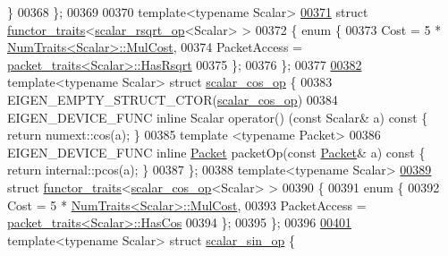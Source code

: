 \begin{DoxyCode}
       \}
00368 \};
00369 
00370 \textcolor{keyword}{template}<\textcolor{keyword}{typename} Scalar>
\hyperlink{struct_eigen_1_1internal_1_1functor__traits_3_01scalar__rsqrt__op_3_01_scalar_01_4_01_4}{00371} \textcolor{keyword}{struct }\hyperlink{struct_eigen_1_1internal_1_1functor__traits}{functor\_traits}<\hyperlink{struct_eigen_1_1internal_1_1scalar__rsqrt__op}{scalar\_rsqrt\_op}<Scalar> >
00372 \{ \textcolor{keyword}{enum} \{
00373     Cost = 5 * \hyperlink{group___core___module_struct_eigen_1_1_num_traits}{NumTraits<Scalar>::MulCost},
00374     PacketAccess = \hyperlink{struct_eigen_1_1internal_1_1packet__traits}{packet\_traits<Scalar>::HasRsqrt}
00375   \};
00376 \};
00377 
\hyperlink{struct_eigen_1_1internal_1_1scalar__cos__op}{00382} \textcolor{keyword}{template}<\textcolor{keyword}{typename} Scalar> \textcolor{keyword}{struct }\hyperlink{struct_eigen_1_1internal_1_1scalar__cos__op}{scalar\_cos\_op} \{
00383   EIGEN\_EMPTY\_STRUCT\_CTOR(\hyperlink{struct_eigen_1_1internal_1_1scalar__cos__op}{scalar\_cos\_op})
00384   EIGEN\_DEVICE\_FUNC \textcolor{keyword}{inline} Scalar operator() (\textcolor{keyword}{const} Scalar& a)\textcolor{keyword}{ const }\{ \textcolor{keywordflow}{return} numext::cos(a); \}
00385   \textcolor{keyword}{template} <\textcolor{keyword}{typename} Packet>
00386   EIGEN\_DEVICE\_FUNC \textcolor{keyword}{inline} \hyperlink{union_eigen_1_1internal_1_1_packet}{Packet} packetOp(\textcolor{keyword}{const} \hyperlink{union_eigen_1_1internal_1_1_packet}{Packet}& a)\textcolor{keyword}{ const }\{ \textcolor{keywordflow}{return} internal::pcos(a); \}
00387 \};
00388 \textcolor{keyword}{template}<\textcolor{keyword}{typename} Scalar>
\hyperlink{struct_eigen_1_1internal_1_1functor__traits_3_01scalar__cos__op_3_01_scalar_01_4_01_4}{00389} \textcolor{keyword}{struct }\hyperlink{struct_eigen_1_1internal_1_1functor__traits}{functor\_traits}<\hyperlink{struct_eigen_1_1internal_1_1scalar__cos__op}{scalar\_cos\_op}<Scalar> >
00390 \{
00391   \textcolor{keyword}{enum} \{
00392     Cost = 5 * \hyperlink{group___core___module_struct_eigen_1_1_num_traits}{NumTraits<Scalar>::MulCost},
00393     PacketAccess = \hyperlink{struct_eigen_1_1internal_1_1packet__traits}{packet\_traits<Scalar>::HasCos}
00394   \};
00395 \};
00396 
\hyperlink{struct_eigen_1_1internal_1_1scalar__sin__op}{00401} \textcolor{keyword}{template}<\textcolor{keyword}{typename} Scalar> \textcolor{keyword}{struct }\hyperlink{struct_eigen_1_1internal_1_1scalar__sin__op}{scalar\_sin\_op} \{

\end{DoxyCode}
